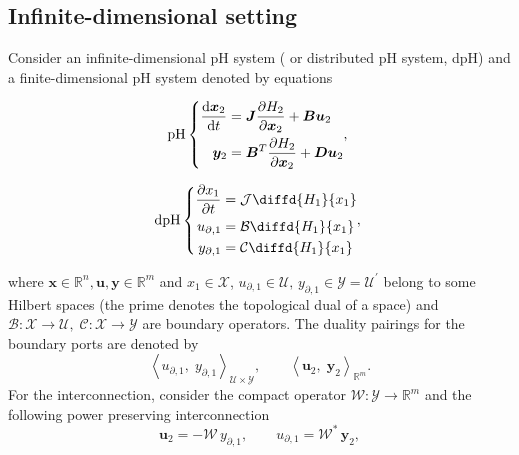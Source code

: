 \documentclass[letterpaper, 10 pt, conference]{ieeeconf}
\begin{document}
\subsection{Infinite-dimensional setting}
Consider an infinite-dimensional pH system ( or distributed pH system, dpH) and a finite-dimensional pH system denoted by equations 

\noindent
\begin{minipage}{.5\linewidth}
	\small\begin{equation}
	\text{pH} \left\{ 
	\begin{aligned}
	\diff{\bm{x}_2}{t} &= \bm{J} \diffp{H_2}{\bm{x}_2} + \bm{B} \bm{u}_2 \\
	\bm{y}_{2} &= \bm{B}^T \diffp{H_2}{\bm{x}_2} + \bm{D} \bm{u}_2 \\
	\end{aligned},
	\right. 
	\end{equation}
\end{minipage} %
\begin{minipage}{.45\linewidth}
	\small\begin{equation}
	\text{dpH} \left\{ 
	\begin{aligned}
	\diffp{x_1}{t} &= \mathcal{J} \diffd{H_1}{x_1} \\
	u_{\partial, 1}  &= \mathcal{B} \diffd{H_1}{x_1} \\
	y_{\partial, 1} &= \mathcal{C} \diffd{H_1}{x_1} \\
	\end{aligned},
	\right.
	\end{equation}
\end{minipage}
where $\bm{x} \in \mathbb{R}^n, \bm{u}, \bm{y} \in \mathbb{R}^m$ and $x_1 \in \mathscr{X}$,  $u_{\partial, 1}  \in \mathscr{U}, \, y_{\partial, 1} \in  \mathscr{Y} = \mathscr{U}^\prime$ belong to some Hilbert spaces (the prime denotes the topological dual of a space)  and  $\mathcal{B}: \mathscr{X} \rightarrow \mathscr{U}, \; \mathcal{C}: \mathscr{X} \rightarrow \mathscr{Y}$ are boundary operators. The duality pairings for the boundary ports are denoted by
\[
\left\langle u_{\partial, 1}, \; y_{\partial, 1} \right\rangle_{\mathscr{U} \times \mathscr{Y}},  \qquad
\left\langle \bm{u}_{2}, \; \bm{y}_{2} \right\rangle_{\mathbb{R}^m}.
\]
For the interconnection, consider the compact operator $\mathcal{W}: \mathscr{Y} \rightarrow \mathbb{R}^m$ and the following power preserving interconnection
\begin{equation}
\label{eq:int_inf}
\bm{u}_2 = -\mathcal{W} \, y_{\partial, 1},  \qquad u_{\partial, 1} = \mathcal{W}^* \, \bm{y}_2,
\end{equation}
\end{document}
